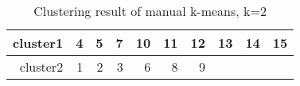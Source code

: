 \begin{table}[htbp]
  \centering
  \caption{Clustering result of manual k-means, k=2}
    \begin{tabular}{rrrrrrrrrr}
    \toprule
    cluster1 & 4     & 5     & 7     & 10    & 11    & 12    & 13    & 14    & 15 \\
    \midrule
    cluster2 & 1     & 2     & 3     & 6     & 8     & 9     &       &       &  \\
    \bottomrule
    \end{tabular}%
  \label{tab:cluster_a}%
\end{table}%
